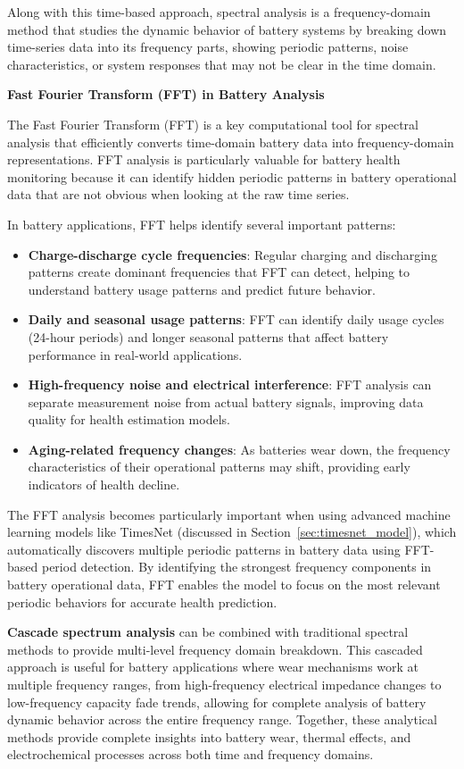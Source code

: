 Along with this time-based approach, spectral analysis is a frequency-domain method that studies the dynamic behavior of battery systems by breaking down time-series data into its frequency parts, showing periodic patterns, noise characteristics, or system responses that may not be clear in the time domain. 

\textbf{Fast Fourier Transform (FFT) in Battery Analysis}

The Fast Fourier Transform (FFT) is a key computational tool for spectral analysis that efficiently converts time-domain battery data into frequency-domain representations. FFT analysis is particularly valuable for battery health monitoring because it can identify hidden periodic patterns in battery operational data that are not obvious when looking at the raw time series.

In battery applications, FFT helps identify several important patterns:

\begin{itemize}
\item \textbf{Charge-discharge cycle frequencies}: Regular charging and discharging patterns create dominant frequencies that FFT can detect, helping to understand battery usage patterns and predict future behavior.
\item \textbf{Daily and seasonal usage patterns}: FFT can identify daily usage cycles (24-hour periods) and longer seasonal patterns that affect battery performance in real-world applications.
\item \textbf{High-frequency noise and electrical interference}: FFT analysis can separate measurement noise from actual battery signals, improving data quality for health estimation models.
\item \textbf{Aging-related frequency changes}: As batteries wear down, the frequency characteristics of their operational patterns may shift, providing early indicators of health decline.
\end{itemize}


The FFT analysis becomes particularly important when using advanced machine learning models like TimesNet (discussed in Section~\ref{sec:timesnet_model}), which automatically discovers multiple periodic patterns in battery data using FFT-based period detection. By identifying the strongest frequency components in battery operational data, FFT enables the model to focus on the most relevant periodic behaviors for accurate health prediction.

\textbf{Cascade spectrum analysis} can be combined with traditional spectral methods to provide multi-level frequency domain breakdown. This cascaded approach is useful for battery applications where wear mechanisms work at multiple frequency ranges, from high-frequency electrical impedance changes to low-frequency capacity fade trends, allowing for complete analysis of battery dynamic behavior across the entire frequency range. Together, these analytical methods provide complete insights into battery wear, thermal effects, and electrochemical processes across both time and frequency domains.

